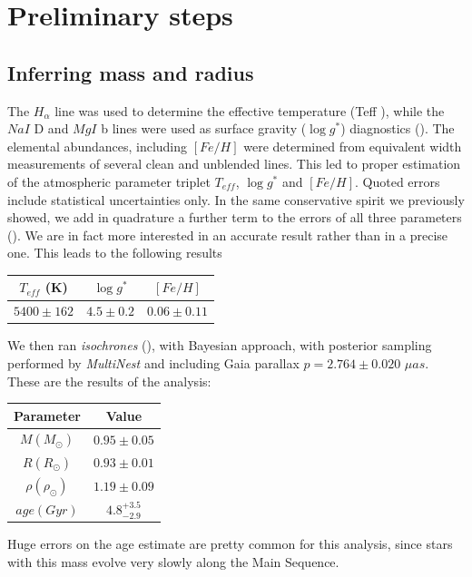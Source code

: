 \documentclass[a4paper,11pt,twocolumn]{article}
\begin{document}
\section{Preliminary steps}

\subsection{Inferring mass and radius}

The $H_{\alpha}$ line was used to determine the effective temperature (Teff ),
while the $NaI$ D and $MgI$ b lines were used as surface gravity
($\log{g^*}$) diagnostics (\cite{Anderson}). The elemental abundances, including $[Fe/H]$ 
were determined from equivalent width measurements of several clean and 
unblended lines. This led to proper estimation of the atmospheric parameter 
triplet $T_{eff}$, $\log{g^*}$ and $[Fe/H]$. Quoted errors include statistical 
uncertainties only. In the same conservative spirit we 
previously showed, we add in quadrature a further term to the errors of 
all three parameters (\cite{Sousa}). We are in fact more interested in an 
accurate result rather than in a precise one.
This leads to the following results 
\begin{center}
    \begin{tabular}{ccc}
    \hline
    $T_{eff}$ (K) & $\log{g^*}$ & $[Fe/H]$ \\
    \hline
    $5400 \pm 162$ & $4.5 \pm 0.2$ & $0.06 \pm 0.11$ \\
    \hline
    \end{tabular}
\end{center}
We then ran \textit{isochrones} (\cite{Morton}), with Bayesian approach, 
with posterior sampling performed by \textit{MultiNest} and including Gaia 
parallax $p=2.764 \pm 0.020$ $\mu as$. These are the results of the 
analysis:
\begin{center}
    \begin{tabular}{cc}
    \hline
    Parameter & Value \\
    \hline
     $M (M_{\odot})$ &  $0.95\pm0.05$ \\
     $R (R_{\odot})$ & $0.93 \pm 0.01$  \\
     $\rho (\rho_{\odot})$ & $1.19 \pm 0.09$ \\
     $age (Gyr)$  & $4.8^{+3.5}_{-2.9}$ \\
    \hline
    \end{tabular}
\end{center}
Huge errors on the age estimate are pretty common for this analysis, since 
stars with this mass evolve very slowly along the Main Sequence.
\end{document}
